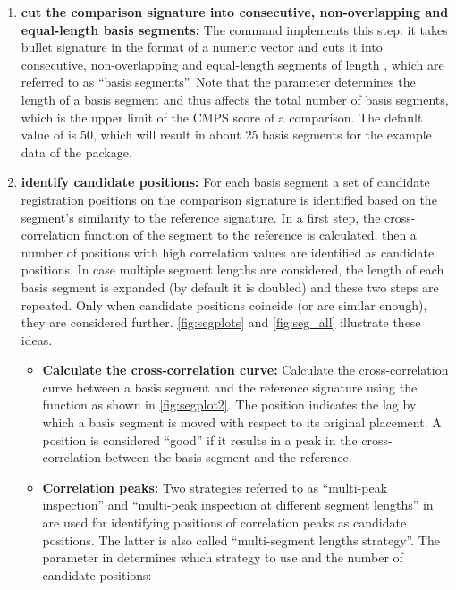 \begin{enumerate}
\def\labelenumi{\arabic{enumi}.}
\item
  \textbf{cut the comparison signature into consecutive, non-overlapping
  and equal-length basis segments:} The command
   implements this step: it takes bullet
  signature  in the format of a numeric vector and cuts it into
  consecutive, non-overlapping and equal-length segments of length
  , which are referred to as ``basis segments''. Note that the
  parameter  determines the length of a basis segment and thus
  affects the total number of basis segments, which is the upper limit
  of the CMPS score of a comparison. The default value of  is
  50, which will result in about 25 basis segments for the example data
  of the package.
\item
  \textbf{identify candidate positions:} For each basis segment a set of
  candidate registration positions on the comparison signature is
  identified based on the segment's similarity to the reference
  signature. In a first step, the cross-correlation function of the
  segment to the reference is calculated, then a number of positions
  with high correlation values are identified as candidate positions. In
  case multiple segment lengths are considered, the length of each basis
  segment is expanded (by default it is doubled) and these two steps are
  repeated. Only when candidate positions coincide (or are similar
  enough), they are considered further. \autoref{fig:segplots} and
  \autoref{fig:seg_all} illustrate these ideas.

  \begin{itemize}
  \item
    \textbf{Calculate the cross-correlation curve:} Calculate the
    cross-correlation curve between a basis segment  and the
    reference signature  using the function
     as shown in \autoref{fig:segplot2}. The
    position indicates the lag by which a basis segment is moved with
    respect to its original placement. A position is considered ``good''
    if it results in a peak in the cross-correlation between the basis
    segment and the reference.
  \item
    \textbf{Correlation peaks:} Two strategies referred to as
    ``multi-peak inspection'' and ``multi-peak inspection at different
    segment lengths'' in \citet{cmps} are used for identifying positions
    of correlation peaks as candidate positions. The latter is also
    called ``multi-segment lengths strategy''. The parameter
     in  determines
    which strategy to use and the number of candidate positions:


\end{itemize}
\end{enumerate}
